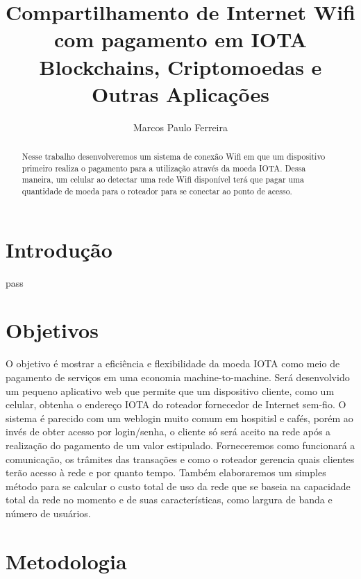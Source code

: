 \documentclass{article}
\begin{document}
\title{%
  Compartilhamento de Internet Wifi com pagamento em IOTA \\
  \large Blockchains, Criptomoedas e Outras Aplicações}
    
\author{Marcos Paulo Ferreira}

\maketitle

\begin{abstract}
Nesse trabalho desenvolveremos um sistema de conexão Wifi em que um dispositivo primeiro realiza
o pagamento para a utilização através da moeda IOTA. Dessa maneira, um celular ao detectar uma rede
Wifi disponível terá que pagar uma quantidade de moeda para o roteador para se conectar ao ponto de acesso.
\end{abstract}


\section{Introdução}\label{sec:Introduction}

pass


\section{Objetivos}\label{sec:Goals}

O objetivo é mostrar a eficiência e flexibilidade da moeda IOTA como meio de pagamento de serviços em uma economia
machine-to-machine. Será desenvolvido um pequeno aplicativo web que permite que um dispositivo cliente, como um
celular, obtenha o endereço IOTA do roteador fornecedor de Internet sem-fio. O sistema é parecido com um weblogin
muito comum em hospitisl e cafés, porém ao invés de obter acesso por login/senha, o cliente só será aceito na rede
após a realização do pagamento de um valor estipulado.
Forneceremos como funcionará a comunicação, os trâmites das transações e como o roteador gerencia quais clientes
terão acesso à rede e por quanto tempo. Também elaboraremos um simples método para se calcular o custo total
de uso da rede que se baseia na capacidade total da rede no momento e de suas características, como largura de banda e
número de usuários.

\section{Metodologia}\label{sec:Metodology}
\end{document}
